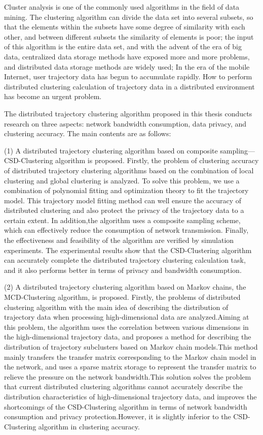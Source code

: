 
\begin{englishabstract}
Cluster analysis is one of the commonly used algorithms in the field of data mining. The clustering algorithm can divide the data set into several subsets, so that the elements within the subsets have some degree of similarity with each other, and between different subsets the similarity of elements is poor; the input of this algorithm is the entire data set, and with the advent of the era of big data, centralized data storage methods have exposed more and more problems, and distributed data storage methods are widely used; In the era of the mobile Internet, user trajectory data has begun to accumulate rapidly. How to perform distributed clustering calculation of trajectory data in a distributed environment has become an urgent problem.

The distributed trajectory clustering algorithm proposed in this thesis conducts research on three aspects: network bandwidth consumption, data privacy, and clustering accuracy. The main contents are as follows:

(1) A distributed trajectory clustering algorithm based on composite sampling—CSD-Clustering algorithm is proposed. Firstly, the problem of clustering accuracy of distributed trajectory clustering algorithms based on the combination of local clustering and global clustering is analyzed. To solve this problem, we use a combination of polynomial fitting and optimization theory to fit the trajectory model. This trajectory model fitting method can well ensure the accuracy of distributed clustering and also protect the privacy of the trajectory data to a certain extent. In addition,the algorithm uses a composite sampling scheme, which can effectively reduce the consumption of network transmission. Finally, the effectiveness and feasibility of the algorithm are verified by simulation experiments. The experimental results show that the CSD-Clustering algorithm can accurately complete the distributed trajectory clustering calculation task, and it also performs better in terms of  privacy and bandwidth consumption.
 
(2) A distributed trajectory clustering algorithm based on Markov chains, the MCD-Clustering algorithm, is proposed. Firstly, the problems of distributed clustering algorithm with the main idea of describing the distribution of trajectory data when processing high-dimensional data are analyzed.Aiming at this problem, the algorithm uses the correlation between various dimensions in the high-dimensional trajectory data, and proposes a method for describing the distribution of trajectory subclusters based on Markov chain models.This method mainly transfers the transfer matrix corresponding to the Markov chain model in the network, and uses a sparse matrix storage to represent the transfer matrix to relieve the pressure on the network bandwidth.This solution solves the problem that current distributed clustering algorithms cannot accurately describe the distribution characteristics of high-dimensional trajectory data, and improves the shortcomings of the CSD-Clustering algorithm in terms of network bandwidth consumption and privacy protection.However, it is slightly inferior to the CSD-Clustering algorithm in clustering accuracy.


\end{englishabstract}
